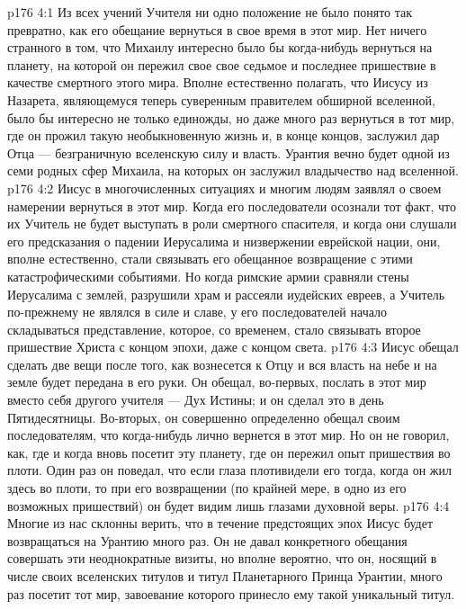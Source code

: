 \vs p176 4:1 Из всех учений Учителя ни одно положение не было понято так превратно, как его обещание вернуться в свое время в этот мир. Нет ничего странного в том, что Михаилу интересно было бы когда\hyp{}нибудь вернуться на планету, на которой он пережил свое свое седьмое и последнее пришествие в качестве смертного этого мира. Вполне естественно полагать, что Иисусу из Назарета, являющемуся теперь суверенным правителем обширной вселенной, было бы интересно не только единожды, но даже много раз вернуться в тот мир, где он прожил такую необыкновенную жизнь и, в конце концов, заслужил дар Отца --- безграничную вселенскую силу и власть. Урантия вечно будет одной из семи родных сфер Михаила, на которых он заслужил владычество над вселенной.
\vs p176 4:2 Иисус в многочисленных ситуациях и многим людям заявлял о своем намерении вернуться в этот мир. Когда его последователи осознали тот факт, что их Учитель не будет выступать в роли смертного спасителя, и когда они слушали его предсказания о падении Иерусалима и низвержении еврейской нации, они, вполне естественно, стали связывать его обещанное возвращение с этими катастрофическими событиями. Но когда римские армии сравняли стены Иерусалима с землей, разрушили храм и рассеяли иудейских евреев, а Учитель по\hyp{}прежнему не являлся в силе и славе, у его последователей начало складываться представление, которое, со временем, стало связывать второе пришествие Христа с концом эпохи, даже с концом света.
\vs p176 4:3 Иисус обещал сделать две вещи после того, как вознесется к Отцу и вся власть на небе и на земле будет передана в его руки. Он обещал, во\hyp{}первых, послать в этот мир вместо себя другого учителя --- Дух Истины; и он сделал это в день Пятидесятницы. Во\hyp{}вторых, он совершенно определенно обещал своим последователям, что когда\hyp{}нибудь лично вернется в этот мир. Но он не говорил, как, где и когда вновь посетит эту планету, где он пережил опыт пришествия во плоти. Один раз он поведал, что если глаза плотивидели его тогда, когда он жил здесь во плоти, то при его возвращении (по крайней мере, в одно из его возможных пришествий) он будет видим лишь глазами духовной веры.
\vs p176 4:4 Многие из нас склонны верить, что в течение предстоящих эпох Иисус будет возвращаться на Урантию много раз. Он не давал конкретного обещания совершать эти неоднократные визиты, но вполне вероятно, что он, носящий в числе своих вселенских титулов и титул Планетарного Принца Урантии, много раз посетит тот мир, завоевание которого принесло ему такой уникальный титул.
